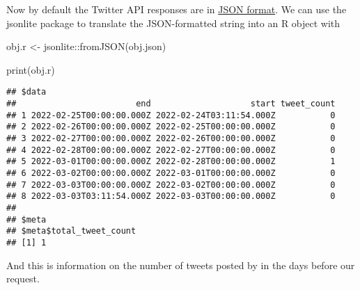 \documentclass[
]{article}
\newenvironment{Shaded}{\begin{snugshade}}{\end{snugshade}}
\newcommand{\FunctionTok}[1]{\textcolor[rgb]{0.00,0.00,0.00}{#1}}
\newcommand{\NormalTok}[1]{#1}
\newcommand{\OtherTok}[1]{\textcolor[rgb]{0.56,0.35,0.01}{#1}}
\newcommand{\SpecialCharTok}[1]{\textcolor[rgb]{0.00,0.00,0.00}{#1}}
\begin{document}
Now by default the Twitter API responses are in \href{https://en.wikipedia.org/wiki/JSON}{JSON format}. We can use the jsonlite package to translate the JSON-formatted string into an R object with

\begin{Shaded}
\begin{Highlighting}[]
\NormalTok{obj.r }\OtherTok{\textless{}{-}} 
\NormalTok{  jsonlite}\SpecialCharTok{::}\FunctionTok{fromJSON}\NormalTok{(obj.json)}
\end{Highlighting}
\end{Shaded}

\begin{Shaded}
\begin{Highlighting}[]
\FunctionTok{print}\NormalTok{(obj.r)}
\end{Highlighting}
\end{Shaded}

\begin{verbatim}
## $data
##                        end                    start tweet_count
## 1 2022-02-25T00:00:00.000Z 2022-02-24T03:11:54.000Z           0
## 2 2022-02-26T00:00:00.000Z 2022-02-25T00:00:00.000Z           0
## 3 2022-02-27T00:00:00.000Z 2022-02-26T00:00:00.000Z           0
## 4 2022-02-28T00:00:00.000Z 2022-02-27T00:00:00.000Z           0
## 5 2022-03-01T00:00:00.000Z 2022-02-28T00:00:00.000Z           1
## 6 2022-03-02T00:00:00.000Z 2022-03-01T00:00:00.000Z           0
## 7 2022-03-03T00:00:00.000Z 2022-03-02T00:00:00.000Z           0
## 8 2022-03-03T03:11:54.000Z 2022-03-03T00:00:00.000Z           0
## 
## $meta
## $meta$total_tweet_count
## [1] 1
\end{verbatim}

And this is information on the number of tweets posted by \citet{TwitterDev} in the days before our request.
\end{document}
